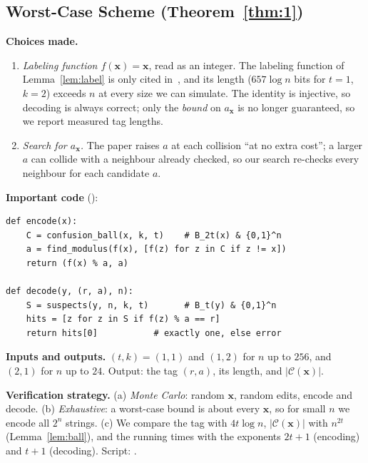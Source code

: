 \documentclass[journal,10pt]{IEEEtran}
\newcommand{\C}{\mathcal{C}}
\newcommand{\bx}{\mathbf{x}}
\begin{document}
\subsection{Worst-Case Scheme (Theorem~\ref{thm:1})}\label{sec:results}
\textbf{Choices made.}
\begin{enumerate}
\item[(i)] \emph{Labeling function $f(\bx)=\bx$}, read as an integer. The labeling function of Lemma~\ref{lem:label} is only cited in~\cite{narayanan}, and its length ($657\log n$ bits for $t=1$, $k=2$) exceeds $n$ at every size we can simulate. The identity is injective, so decoding is always correct; only the \emph{bound} on $a_{\bx}$ is no longer guaranteed, so we report measured tag lengths.
\item[(ii)] \emph{Search for $a_{\bx}$.} The paper raises $a$ at each collision ``at no extra cost''; a larger $a$ can collide with a neighbour already checked, so our search re-checks every neighbour for each candidate $a$.
\end{enumerate}

\textbf{Important code} ():
\par\medskip\noindent\hspace*{1em}\begin{minipage}{\dimexpr\columnwidth-1em}\scriptsize
\begin{verbatim}
def encode(x):
    C = confusion_ball(x, k, t)    # B_2t(x) & {0,1}^n
    a = find_modulus(f(x), [f(z) for z in C if z != x])
    return (f(x) % a, a)

def decode(y, (r, a), n):
    S = suspects(y, n, k, t)       # B_t(y) & {0,1}^n
    hits = [z for z in S if f(z) % a == r]
    return hits[0]           # exactly one, else error
\end{verbatim}
\end{minipage}\par\medskip

\textbf{Inputs and outputs.} $(t,k)=(1,1)$ and $(1,2)$ for $n$ up to $256$, and $(2,1)$ for $n$ up to $24$. Output: the tag $(r,a)$, its length, and $|\C(\bx)|$.

\textbf{Verification strategy.} (a) \emph{Monte Carlo}: random $\bx$, random edits, encode and decode. (b) \emph{Exhaustive}: a worst-case bound is about every $\bx$, so for small $n$ we encode all $2^n$ strings. (c) We compare the tag with $4t\log n$, $|\C(\bx)|$ with $n^{2t}$ (Lemma~\ref{lem:ball}), and the running times with the exponents $2t+1$ (encoding) and $t+1$ (decoding). Script: .
\end{document}
